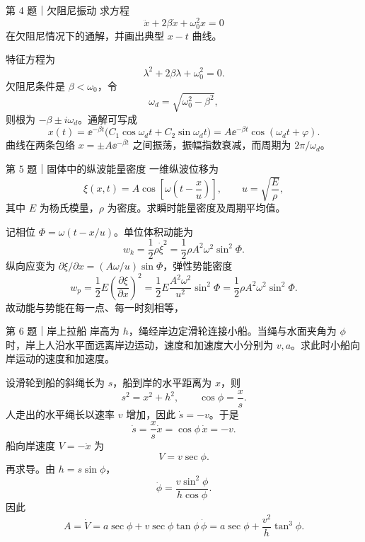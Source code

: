 \begin{problem}{第 4 题｜欠阻尼振动}
求方程
\[
\ddot x+2\beta\dot x+\omega_0^2x=0
\]
在欠阻尼情况下的通解，并画出典型 $x-t$ 曲线。
\end{problem}
\begin{solution}
特征方程为
\[
\lambda^2+2\beta\lambda+\omega_0^2=0.
\]
欠阻尼条件是 $\beta<\omega_0$，令
\[
\omega_d=\sqrt{\omega_0^2-\beta^2},
\]
则根为 $-\beta\pm i\omega_d$。通解可写成
\[
\boxed{x(t)=\ee^{-\beta t}\bigl(C_1\cos\omega_dt+C_2\sin\omega_dt\bigr)
=A\ee^{-\beta t}\cos(\omega_dt+\varphi)}.
\]
曲线在两条包络 $x=\pm A\ee^{-\beta t}$ 之间振荡，振幅指数衰减，而周期为 $2\pi/\omega_d$。
\begin{center}
\end{center}
\end{solution}

\begin{problem}{第 5 题｜固体中的纵波能量密度}
一维纵波位移为
\[
\xi(x,t)=A\cos\left[\omega\left(t-\frac{x}{u}\right)\right],
\qquad u=\sqrt{\frac{E}{\rho}},
\]
其中 $E$ 为杨氏模量，$\rho$ 为密度。求瞬时能量密度及周期平均值。
\end{problem}
\begin{solution}
记相位 $\Phi=\omega(t-x/u)$。单位体积动能为
\[
w_k=\frac12\rho\dot\xi^2
=\frac12\rho A^2\omega^2\sin^2\Phi.
\]
纵向应变为 $\partial\xi/\partial x=(A\omega/u)\sin\Phi$，弹性势能密度
\[
w_p=\frac12E\left(\frac{\partial\xi}{\partial x}\right)^2
=\frac12E\frac{A^2\omega^2}{u^2}\sin^2\Phi
=\frac12\rho A^2\omega^2\sin^2\Phi.
\]
故动能与势能在每一点、每一时刻相等，
\end{solution}

\begin{problem}{第 6 题｜岸上拉船}
岸高为 $h$，绳经岸边定滑轮连接小船。当绳与水面夹角为 $\phi$ 时，岸上人沿水平面远离岸边运动，速度和加速度大小分别为 $v,a$。求此时小船向岸运动的速度和加速度。
\FigBoat
\end{problem}
\begin{solution}
设滑轮到船的斜绳长为 $s$，船到岸的水平距离为 $x$，则
\[
s^2=x^2+h^2,
\qquad \cos\phi=\frac{x}{s}.
\]
人走出的水平绳长以速率 $v$ 增加，因此 $\dot s=-v$。于是
\[
\dot s=\frac{x}{s}\dot x=\cos\phi\,\dot x=-v.
\]
船向岸速度 $V=-\dot x$ 为
\[
V=v\sec\phi.
\]
再求导。由 $h=s\sin\phi$，
\[
\dot\phi=\frac{v\sin^2\phi}{h\cos\phi}.
\]
因此
\[
A=\dot V=a\sec\phi+v\sec\phi\tan\phi\,\dot\phi
=a\sec\phi+\frac{v^2}{h}\tan^3\phi.
\]
\end{solution}

